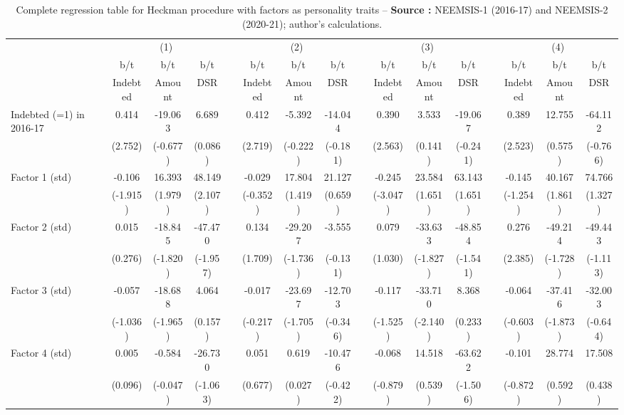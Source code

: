 {\tiny\tabcolsep=0pt
    \begin{longtable}{@{\extracolsep{\fill}}lccccccccccccccc}
	\caption{Complete regression table for Heckman procedure with factors as personality traits --  \textbf{Source :} NEEMSIS-1 (2016-17) and NEEMSIS-2 (2020-21); author's calculations.} \\
    \toprule
      & \multicolumn{3}{c}{(1)} &   & \multicolumn{3}{c}{(2)} &   & \multicolumn{3}{c}{(3)} &   & \multicolumn{3}{c}{(4)} \\
\cmidrule{2-4}\cmidrule{6-8}\cmidrule{10-12}\cmidrule{14-16}      & b/t & b/t & b/t &   & b/t & b/t & b/t &   & b/t & b/t & b/t &   & b/t & b/t & b/t \\
      & Indebted & Amount & DSR &   & Indebted & Amount & DSR &   & Indebted & Amount & DSR &   & Indebted & Amount & DSR \\
    \midrule
    Indebted (=1) in 2016-17 & 0.414 & -19.063 & 6.689 &   & 0.412 & -5.392 & -14.044 &   & 0.390 & 3.533 & -19.067 &   & 0.389 & 12.755 & -64.112 \\
      & (2.752) & (-0.677) & (0.086) &   & (2.719) & (-0.222) & (-0.181) &   & (2.563) & (0.141) & (-0.241) &   & (2.523) & (0.575) & (-0.766) \\
    Factor 1 (std) & -0.106 & 16.393 & 48.149 &   & -0.029 & 17.804 & 21.127 &   & -0.245 & 23.584 & 63.143 &   & -0.145 & 40.167 & 74.766 \\
      & (-1.915) & (1.979) & (2.107) &   & (-0.352) & (1.419) & (0.659) &   & (-3.047) & (1.651) & (1.651) &   & (-1.254) & (1.861) & (1.327) \\
    Factor 2 (std) & 0.015 & -18.845 & -47.470 &   & 0.134 & -29.207 & -3.555 &   & 0.079 & -33.633 & -48.854 &   & 0.276 & -49.214 & -49.443 \\
      & (0.276) & (-1.820) & (-1.957) &   & (1.709) & (-1.736) & (-0.131) &   & (1.030) & (-1.827) & (-1.541) &   & (2.385) & (-1.728) & (-1.113) \\
    Factor 3 (std) & -0.057 & -18.688 & 4.064 &   & -0.017 & -23.697 & -12.703 &   & -0.117 & -33.710 & 8.368 &   & -0.064 & -37.416 & -32.003 \\
      & (-1.036) & (-1.965) & (0.157) &   & (-0.217) & (-1.705) & (-0.346) &   & (-1.525) & (-2.140) & (0.233) &   & (-0.603) & (-1.873) & (-0.644) \\
    Factor 4 (std) & 0.005 & -0.584 & -26.730 &   & 0.051 & 0.619 & -10.476 &   & -0.068 & 14.518 & -63.622 &   & -0.101 & 28.774 & 17.508 \\
      & (0.096) & (-0.047) & (-1.063) &   & (0.677) & (0.027) & (-0.422) &   & (-0.879) & (0.539) & (-1.506) &   & (-0.872) & (0.592) & (0.438) \\

\end{longtable}}
